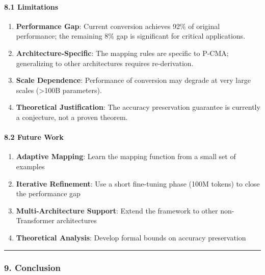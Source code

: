 \documentclass[
  11pt,
  a4paper,
]{article}
\providecommand{\tightlist}{%
  \setlength{\itemsep}{0pt}\setlength{\parskip}{0pt}}
\begin{document}
\paragraph{8.1 Limitations}\label{limitations-2}

\begin{enumerate}
\def\labelenumi{\arabic{enumi}.}
\tightlist
\item
  \textbf{Performance Gap}: Current conversion achieves 92\% of original
  performance; the remaining 8\% gap is significant for critical
  applications.
\item
  \textbf{Architecture-Specific}: The mapping rules are specific to
  P-CMA; generalizing to other architectures requires re-derivation.
\item
  \textbf{Scale Dependence}: Performance of conversion may degrade at
  very large scales (\textgreater100B parameters).
\item
  \textbf{Theoretical Justification}: The accuracy preservation
  guarantee is currently a conjecture, not a proven theorem.
\end{enumerate}

\paragraph{8.2 Future Work}\label{future-work-1}

\begin{enumerate}
\def\labelenumi{\arabic{enumi}.}
\tightlist
\item
  \textbf{Adaptive Mapping}: Learn the mapping function from a small set
  of examples
\item
  \textbf{Iterative Refinement}: Use a short fine-tuning phase (100M
  tokens) to close the performance gap
\item
  \textbf{Multi-Architecture Support}: Extend the framework to other
  non-Transformer architectures
\item
  \textbf{Theoretical Analysis}: Develop formal bounds on accuracy
  preservation
\end{enumerate}

\begin{center}\rule{0.5\linewidth}{0.5pt}\end{center}

\subsubsection{9. Conclusion}\label{conclusion-2}
\end{document}
